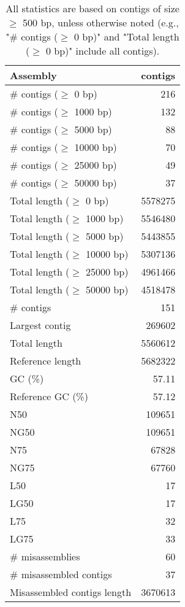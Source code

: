 \documentclass[12pt,a4paper]{article}
\begin{document}
\begin{table}[ht]
\begin{center}
\caption{All statistics are based on contigs of size $\geq$ 500 bp, unless otherwise noted (e.g., "\# contigs ($\geq$ 0 bp)" and "Total length ($\geq$ 0 bp)" include all contigs).}
\begin{tabular}{|l*{1}{|r}|}
\hline
Assembly & contigs \\ \hline
\# contigs ($\geq$ 0 bp) & 216 \\ \hline
\# contigs ($\geq$ 1000 bp) & 132 \\ \hline
\# contigs ($\geq$ 5000 bp) & 88 \\ \hline
\# contigs ($\geq$ 10000 bp) & 70 \\ \hline
\# contigs ($\geq$ 25000 bp) & 49 \\ \hline
\# contigs ($\geq$ 50000 bp) & 37 \\ \hline
Total length ($\geq$ 0 bp) & 5578275 \\ \hline
Total length ($\geq$ 1000 bp) & 5546480 \\ \hline
Total length ($\geq$ 5000 bp) & 5443855 \\ \hline
Total length ($\geq$ 10000 bp) & 5307136 \\ \hline
Total length ($\geq$ 25000 bp) & 4961466 \\ \hline
Total length ($\geq$ 50000 bp) & 4518478 \\ \hline
\# contigs & 151 \\ \hline
Largest contig & 269602 \\ \hline
Total length & 5560612 \\ \hline
Reference length & 5682322 \\ \hline
GC (\%) & 57.11 \\ \hline
Reference GC (\%) & 57.12 \\ \hline
N50 & 109651 \\ \hline
NG50 & 109651 \\ \hline
N75 & 67828 \\ \hline
NG75 & 67760 \\ \hline
L50 & 17 \\ \hline
LG50 & 17 \\ \hline
L75 & 32 \\ \hline
LG75 & 33 \\ \hline
\# misassemblies & 60 \\ \hline
\# misassembled contigs & 37 \\ \hline
Misassembled contigs length & 3670613 \\ \hline

\end{tabular}
\end{center}
\end{table}
\end{document}
